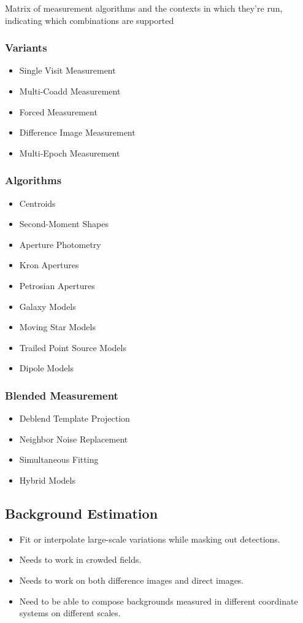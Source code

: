 \begin{note}
Matrix of measurement algorithms and the contexts in which they're run, indicating which combinations are supported
\end{note}

\subsubsection{Variants}
\begin{itemize}
\item Single Visit Measurement
\item Multi-Coadd Measurement
\item Forced Measurement
\item Difference Image Measurement
\item Multi-Epoch Measurement
\end{itemize}
\subsubsection{Algorithms}
\begin{itemize}
\item Centroids
\item Second-Moment Shapes
\item Aperture Photometry
\item Kron Apertures
\item Petrosian Apertures
\item Galaxy Models
\item Moving Star Models
\item Trailed Point Source Models
\item Dipole Models
\end{itemize}
\subsubsection{Blended Measurement}
\begin{itemize}
\item Deblend Template Projection
\item Neighbor Noise Replacement
\item Simultaneous Fitting
\item Hybrid Models
\end{itemize}

\subsection{Background Estimation}
\begin{itemize}
\item Fit or interpolate large-scale variations while masking out detections.
\item Needs to work in crowded fields.
\item Needs to work on both difference images and direct images.
\item Need to be able to compose backgrounds measured in different coordinate systems on different scales.
\end{itemize}

